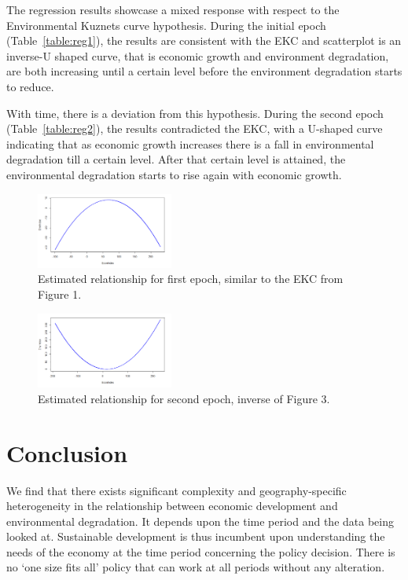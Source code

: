 \documentclass[doublespace,times,Afour,review]{template/sagej}
\begin{document}
The regression results showcase a mixed response with respect to the Environmental Kuznets curve hypothesis. During the initial epoch (Table~\ref{table:reg1}), the results are consistent with the EKC and scatterplot is an inverse-U shaped curve, that is economic growth and environment degradation, are both increasing until a certain level before the environment degradation starts to reduce.

With time, there is a deviation from this hypothesis. During the second epoch (Table~\ref{table:reg2}), the results contradicted the EKC, with a U-shaped curve indicating that as economic growth increases there is a fall in environmental degradation till a certain level. After that certain level is attained, the environmental degradation starts to rise again with economic growth.

\begin{figure}[h]
    \centering
    \includegraphics[width=0.4\textwidth]{images/kuznets.png}
    \caption{Estimated relationship for first epoch, similar to the EKC from Figure 1.}
\end{figure}

\begin{figure}[h]
    \centering
    \includegraphics[width=0.4\textwidth]{images/notkuznets.png}
    \caption{Estimated relationship for second epoch, inverse of Figure 3.}
\end{figure}



\section{Conclusion}

We find that there exists significant complexity and geography-specific heterogeneity in the relationship between economic development and environmental degradation. It depends upon the time period and the data being looked at. Sustainable development is thus incumbent upon understanding the needs of the economy at the time period concerning the policy decision. There is no ‘one size fits all’ policy that can work at all periods without any alteration.
\end{document}

